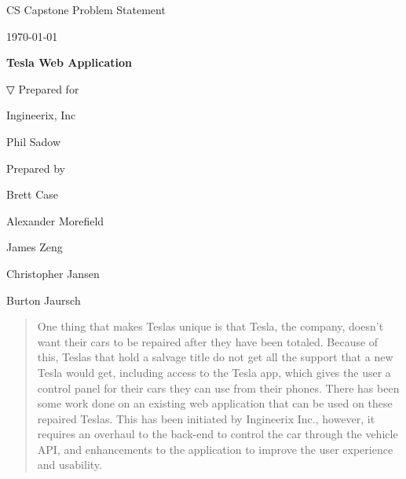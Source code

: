\documentclass[onecolumn, draftclsnofoot,10pt, compsoc]{IEEEtran}
\def \CapstoneTeamName{                 The Cleverly Named Team}
\def \CapstoneTeamNumber{               22}
\def \GroupMemberOne{                   Brett Case}
\def \GroupMemberTwo{                   Alexander Morefield}
\def \GroupMemberThree{                 James Zeng}
\def \GroupMemberFour{                  Christopher Jansen}
\def \GroupMemberFive{                  Burton Jaursch}
\def \CapstoneProjectName{              Tesla Web Application}
\def \CapstoneSponsorCompany{           Ingineerix, Inc}
\def \CapstoneSponsorPerson{            Phil Sadow}
\def \DocType{          Problem Statement
                                }
\newcommand{\NameSigPair}[1]{\par
\makebox[2.75in][r]{#1} \hfil   \makebox[3.25in]{\makebox[2.25in]{\hrulefill} \hfill            \makebox[.75in]{\hrulefill}}
\par\vspace{-12pt} \textit{\tiny\noindent
\makebox[2.75in]{} \hfil                \makebox[3.25in]{\makebox[2.25in][r]{Signature} \hfill  \makebox[.75in][r]{Date}}}}
\renewcommand{\NameSigPair}[1]{#1}
\begin{document}
\begin{titlepage}
    \begin{singlespace}
        \hfill
        \par\vspace{.2in}
        \centering
        \scshape{
            \huge CS Capstone \DocType \par
            {\large\today}\par
            \vspace{.5in}
            \textbf{\Huge\CapstoneProjectName}\par
            \vfill

▽
            \vfill
            {\large Prepared for}\par
            \Huge \CapstoneSponsorCompany\par
            \vspace{5pt}
            {\Large\NameSigPair{\CapstoneSponsorPerson}\par}
            {\large Prepared by }\par
            \vspace{5pt}
            {\Large
                \NameSigPair{\GroupMemberOne}\par
                \NameSigPair{\GroupMemberTwo}\par
                \NameSigPair{\GroupMemberThree}\par
                \NameSigPair{\GroupMemberFour}\par
                \NameSigPair{\GroupMemberFive}\par
            }
            \vspace{20pt}
        }
        \begin{abstract}
        One thing that makes Teslas unique is that Tesla, the company, doesn't want their cars to be repaired after they have been totaled.
        Because of this, Teslas that hold a salvage title do not get all the support that a new Tesla would get, including access to the Tesla app, which gives the user a control panel for their cars they can use from their phones.
        There has been some work done on an existing web application that can be used on these repaired Teslas.
        This has been initiated by Ingineerix Inc., however, it requires an overhaul to the back-end to control the car through the vehicle API, and enhancements to the application to improve the user experience and usability.
        \end{abstract}
    \end{singlespace}
\end{titlepage}
\newpage
{}
\tableofcontents
\clearpage
\end{document}
